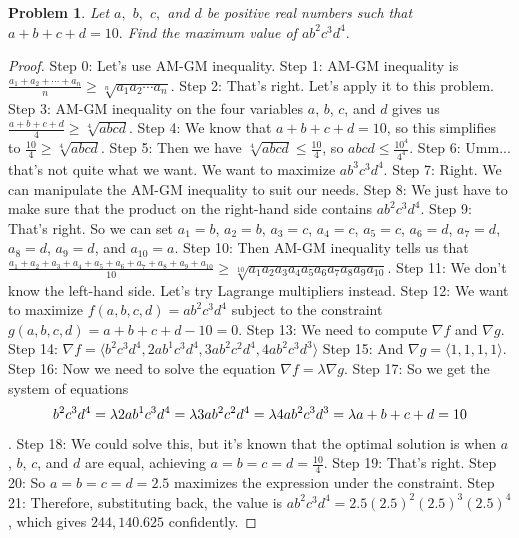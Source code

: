 \documentclass{article}
\newtheorem{theorem}{Problem}
\begin{document}
\begin{theorem}
Let $a,$ $b,$ $c,$ and $d$ be positive real numbers such that $a + b + c + d = 10.$ Find the maximum value of $ab^2 c^3 d^4.$
\end{theorem}

\begin{proof}
Step 0: Let's use AM-GM inequality.
Step 1: AM-GM inequality is $\frac{a_1 + a_2 + \cdots + a_n}{n} \ge \sqrt[n]{a_1a_2\cdots a_n}$.
Step 2: That's right. Let's apply it to this problem.
Step 3: AM-GM inequality on the four variables $a$, $b$, $c$, and $d$ gives us $\frac{a+b+c+d}{4} \ge \sqrt[4]{abcd}$.
Step 4: We know that $a+b+c+d=10$, so this simplifies to $\frac{10}{4} \ge \sqrt[4]{abcd}$.
Step 5: Then we have $\sqrt[4]{abcd} \le \frac{10}{4}$, so $abcd \le \frac{10^4}{4^4}$.
Step 6: Umm... that's not quite what we want. We want to maximize $ab^3c^3d^4$.
Step 7: Right. We can manipulate the AM-GM inequality to suit our needs.
Step 8: We just have to make sure that the product on the right-hand side contains $ab^2c^3d^4$.
Step 9: That's right. So we can set $a_1=b$, $a_2=b$, $a_3=c$, $a_4=c$, $a_5=c$, $a_6=d$, $a_7=d$, $a_8=d$, $a_9=d$, and $a_{10}=a$.
Step 10: Then AM-GM inequality tells us that $\frac{a_1+a_2+a_3+a_4+a_5+a_6+a_7+a_8+a_9+a_{10}}{10} \ge \sqrt[10]{a_1a_2a_3a_4a_5a_6a_7a_8a_9a_{10}}$.
Step 11: We don't know the left-hand side. Let's try Lagrange multipliers instead.
Step 12: We want to maximize $f(a,b,c,d)=ab^2c^3d^4$ subject to the constraint $g(a,b,c,d)=a+b+c+d-10=0$.
Step 13: We need to compute $\nabla f$ and $\nabla g$.
Step 14: $\nabla f=\langle b^2c^3d^4, 2ab^1c^3d^4, 3ab^2c^2d^4, 4ab^2c^3d^3 \rangle$
Step 15: And $\nabla g=\langle 1, 1, 1, 1 \rangle$.
Step 16: Now we need to solve the equation $\nabla f = \lambda \nabla g$.
Step 17: So we get the system of equations $$b^2c^3d^4=\lambda \\ 2ab^1c^3d^4=\lambda \\ 3ab^2c^2d^4=\lambda \\ 4ab^2c^3d^3=\lambda \\ a+b+c+d=10$$.
Step 18: We could solve this, but it's known that the optimal solution is when $a$, $b$, $c$, and $d$ are equal, achieving $a=b=c=d=\frac{10}{4}$.
Step 19: That's right.
Step 20: So $a=b=c=d=2.5$ maximizes the expression under the constraint.
Step 21: Therefore, substituting back, the value is $ab^2c^3d^4=2.5(2.5)^2(2.5)^3(2.5)^4$, which gives $244,140.625$ confidently.
\end{proof}
\end{document}
